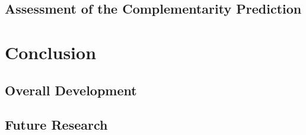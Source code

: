 \documentclass[12pt]{article}
\begin{document}
\subsection{Assessment of the Complementarity Prediction} 












\section{Conclusion}



\subsection{Overall Development}












\subsection{Future Research}
\end{document}
